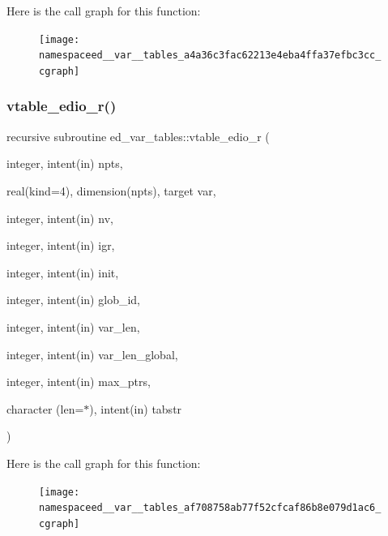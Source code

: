 Here is the call graph for this function\+:
\nopagebreak
\begin{figure}[H]
\begin{center}
\leavevmode
\texttt{[image: namespaceed\_\_var\_\_tables\_a4a36c3fac62213e4eba4ffa37efbc3cc\_cgraph]}
\end{center}
\end{figure}
\mbox{\label{namespaceed__var__tables_af708758ab77f52cfcaf86b8e079d1ac6}} 
\subsubsection{\texorpdfstring{vtable\+\_\+edio\+\_\+r()}{vtable\_edio\_r()}}
{\footnotesize\ttfamily recursive subroutine ed\+\_\+var\+\_\+tables\+::vtable\+\_\+edio\+\_\+r (\begin{DoxyParamCaption}\item[{integer, intent(in)}]{npts,  }\item[{real(kind=4), dimension(npts), target}]{var,  }\item[{integer, intent(in)}]{nv,  }\item[{integer, intent(in)}]{igr,  }\item[{integer, intent(in)}]{init,  }\item[{integer, intent(in)}]{glob\+\_\+id,  }\item[{integer, intent(in)}]{var\+\_\+len,  }\item[{integer, intent(in)}]{var\+\_\+len\+\_\+global,  }\item[{integer, intent(in)}]{max\+\_\+ptrs,  }\item[{character (len=$\ast$), intent(in)}]{tabstr }\end{DoxyParamCaption})}

Here is the call graph for this function\+:
\nopagebreak
\begin{figure}[H]
\begin{center}
\leavevmode
\texttt{[image: namespaceed\_\_var\_\_tables\_af708758ab77f52cfcaf86b8e079d1ac6\_cgraph]}
\end{center}
\end{figure}
\mbox{\label{namespaceed__var__tables_ab31d558ee32110b06b2fc41dd2e2070b}} 
